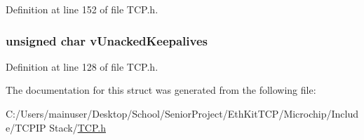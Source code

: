 Definition at line 152 of file T\+C\+P.\+h.

\hypertarget{struct_t_c_b___s_t_u_b_aa2eabcef6e3f7cb140ddc43f3b0f01f2}{}
\subsubsection[{v\+Unacked\+Keepalives}]{\setlength{\rightskip}{0pt plus 5cm}unsigned char v\+Unacked\+Keepalives}\label{struct_t_c_b___s_t_u_b_aa2eabcef6e3f7cb140ddc43f3b0f01f2}


Definition at line 128 of file T\+C\+P.\+h.



The documentation for this struct was generated from the following file\+:\begin{DoxyCompactItemize}
\item 
C\+:/\+Users/mainuser/\+Desktop/\+School/\+Senior\+Project/\+Eth\+Kit\+T\+C\+P/\+Microchip/\+Include/\+T\+C\+P\+I\+P Stack/\hyperlink{_t_c_p_8h}{T\+C\+P.\+h}\end{DoxyCompactItemize}
